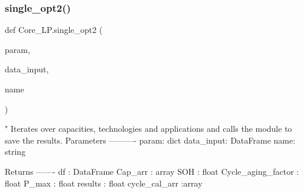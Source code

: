\subsubsection{\texorpdfstring{single\+\_\+opt2()}{single\_opt2()}}
{\footnotesize\ttfamily def Core\+\_\+\+L\+P.\+single\+\_\+opt2 (\begin{DoxyParamCaption}\item[{}]{param,  }\item[{}]{data\+\_\+input,  }\item[{}]{name }\end{DoxyParamCaption})}

\begin{DoxyVerb}"
Iterates over capacities, technologies and applications and calls the module to save the results.
Parameters
----------
param: dict
data_input: DataFrame
name: string

Returns
-------
df : DataFrame
Cap_arr : array
SOH : float
Cycle_aging_factor : float
P_max : float
results : float
cycle_cal_arr :array
\end{DoxyVerb}
 